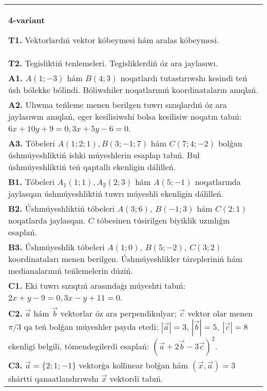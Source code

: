 \documentclass{article}
\begin{document}
\begin{tabular}{m{17cm}}
\textbf{4-variant}

\textbf{T1.} 
Vektorlardıń vektor kóbeymesi hám aralas kóbeymesi.
 \\
\textbf{T2.} 
Tegisliktiń tenlemeleri. Tegisliklerdiń óz ara jaylasıwı.
 \\
\textbf{A1.} 
$A (1;-3) $ hám $B (4;3) $ noqatlardı tutastırıwshı
kesindi teń úsh bólekke bólindi. Bóliwshiler noqatlarınıń koordinataların
anıqlań.
 \\
\textbf{A2.} 
Ulıwma teńleme menen berilgen tuwrı sızıqlardıń
óz ara jaylasıwın anıqlań, eger kesilisiwshi bolsa kesilisiw noqatın
tabıń: $6x+10y+9=0, 3x+5y-6=0$.
 \\
\textbf{A3.} 
Tóbeleri $A (1;2;1), B (3;-1;7) $ hám $C (7;4;-2) $ bolǵan úshmúyeshliktiń
ishki múyeshlerin esaplap tabıń. Bul úshmúyeshliktiń teń qaptallı ekenligin dálilleń.
 \\
\textbf{B1.} 
Tóbeleri $A_1 (1; 1), A_2 (2; 3) $ hám $A (5;-1) $
noqatlarında jaylasqan úshmúyeshliktiń tuwrı múyeshli ekenligin dálilleń.
 \\
\textbf{B2.} 
Úshmúyeshliktiń tóbeleri \(A (3;6),\ B (-1;3) \) hám
\(C (2: 1) \) noqatlarda jaylasqan. $C$ tóbesinen túsirilgen biyiklik uzınlıǵın esaplań.
 \\
\textbf{B3.} 
Úshmúyeshlik tóbeleri \(A (1;0),\ B (5;-2),\ C (3;2) \)
koordinataları menen berilgen. Úshmúyeshlikler tárepleriniń hám
medianalarınıń teńlemelerin dúziń.
 \\
\textbf{C1.} 
Eki tuwrı sızıqtıń arasındaģı múyeshti tabıń: $2x+y-9=0, 3x-y+11=0$.
 \\
\textbf{C2.} 
$\vec{a}$ hám $\vec{b}$ vektorlar óz ara perpendikulyar; $\vec{c}$ vektor olar menen $\pi/3$ qa teń bolǵan múyeshler payda etedi; $|\vec{a}| = 3$, $|\vec{b}| = 5,\ |\vec{c}| = 8$ ekenligi belgili, tómendegilerdi esaplań:
$ (\vec{a} + 2\vec{b} - 3\vec{c}) ^{2}$.
 \\
\textbf{C3.} 
$\vec{a} = \{ 2;1; - 1\}$ vektorģa kollinear bolǵan hám $\left(\vec{x},\vec{a} \right) = 3$ shártti qanaatlandırıwshı $\vec{x}$ vektordi tabıń.
 \\

\end{tabular}
\vspace{1cm}
\end{document}

